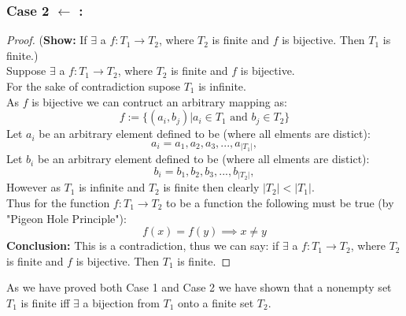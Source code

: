 \documentclass[11pt]{article}
\theoremstyle{plain}
\begin{document}
\subsubsection*{Case 2 $\leftarrow$ :}
\begin{proof} (\textbf{Show:} If $\exists$ a $f: T_1 \rightarrow  T_2$, where $T_2$ is finite and $f$ is bijective. Then $T_1$ is finite.) \\
	Suppose $\exists$ a $f: T_1 \rightarrow  T_2$, where $T_2$ is finite and $f$ is bijective. \\
	For the sake of contradiction supose $T_1$ is infinite. \\
	As $f$ is bijective we can contruct an arbitrary mapping as:
	\[
		f := \{ (a_i,b_j) | a_i \in T_1 \text{ and } b_j \in T_2 \}
	\]
	Let $a_i$ be an arbitrary element defined to be (where all elments are distict):
	\[
		a_i = a_1, a_2, a_3, ..., a_{|T_1|},
	\]
	Let $b_i$ be an arbitrary element defined to be (where all elments are distict):
	\[
		b_i = b_1, b_2, b_3, ..., b_{|T_2|},
	\]
	However as $T_1$ is infinite and $T_2$ is finite then clearly $|T_2| < |T_1|$. \\
	Thus for the function $f: T_1 \rightarrow T_2$ to be a function the following must be true (by "Pigeon Hole Principle"):
	\[
		f(x) = f(y) \implies x \neq y
	\]
	\textbf{Conclusion:} This is a contradiction, thus we can say: if $\exists$ a $f: T_1 \rightarrow  T_2$, where $T_2$ is finite and $f$ is bijective. Then $T_1$ is finite.
\end{proof}
\begin{center}
    As we have proved both Case 1 and Case 2 we have shown that a nonempty set $T_1$ is finite iff $\exists$ a bijection from $T_1$ onto a finite set $T_2$.
\end{center}
\end{document}
